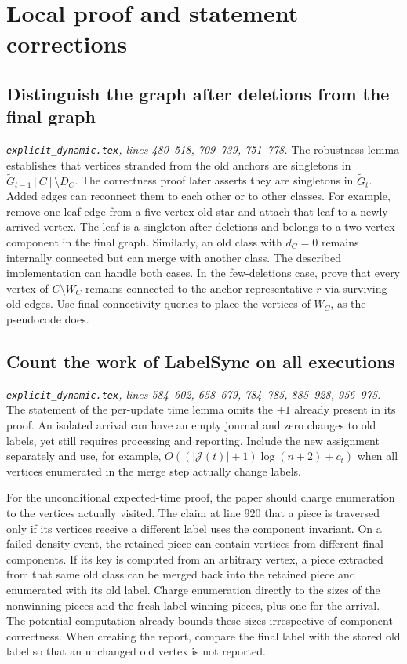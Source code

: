 \documentclass[11pt]{article}
\newcommand{\loc}[2]{\textit{#1, lines #2.}}
\newcommand{\ed}[1]{\loc{\texttt{explicit\_dynamic.tex}}{#1}}
\begin{document}
\section{Local proof and statement corrections}

\subsection{Distinguish the graph after deletions from the final graph}

\ed{480--518, 709--739, 751--778}
The robustness lemma establishes that vertices stranded from the old
anchors are singletons in \(\widetilde G_{t-1}[C]\setminus D_C\).
The correctness proof later asserts they are singletons in
\(\widetilde G_t\). Added edges can reconnect them to each other or to
other classes. For example, remove one leaf edge from a five-vertex old
star and attach that leaf to a newly arrived vertex. The leaf is a
singleton after deletions and belongs to a two-vertex component in the
final graph. Similarly, an old class with \(d_C=0\) remains internally
connected but can merge with another class. The described implementation
can handle both cases. In the few-deletions case, prove that every vertex
of \(C\setminus W_C\) remains connected to the anchor representative
\(r\) via surviving old edges. Use final connectivity queries to place
the vertices of \(W_C\), as the pseudocode does.

\subsection{Count the work of \textsf{LabelSync} on all executions}

\ed{584--602, 658--679, 784--785, 885--928, 956--975}
The statement of the per-update time lemma omits the \(+1\) already
present in its proof. An isolated arrival can have an empty journal
and zero changes to old labels, yet still requires processing and
reporting. Include the new assignment separately and use, for example,
\(O((|\mathcal J(t)|+1)\log(n+2)+c_t)\) when all vertices enumerated
in the merge step actually change labels.

For the unconditional expected-time proof, the paper should charge
enumeration to the vertices actually visited. The claim at line 920
that a piece is traversed only if its vertices receive a different label
uses the component invariant. On a failed density event, the retained
piece can contain vertices from different final components. If its key
is computed from an arbitrary vertex, a piece extracted from that same
old class can be merged back into the retained piece and enumerated
with its old label. Charge enumeration directly to the sizes of the
nonwinning pieces and the fresh-label winning pieces, plus one for the
arrival. The potential computation already bounds these sizes
irrespective of component correctness. When creating the report, compare
the final label with the stored old label so that an unchanged old
vertex is not reported.
\end{document}
